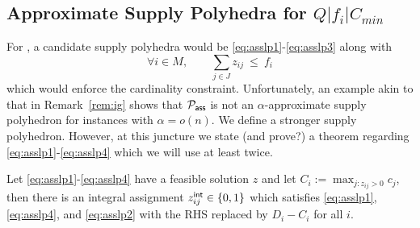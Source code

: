 \subsection{Approximate Supply Polyhedra for $Q|f_i|C_{min}$}
For \cckp, a candidate supply polyhedra would be \eqref{eq:asslp1}-\eqref{eq:asslp3} along with 
\begin{equation}
\textstyle \forall i\in M, \qquad \sum_{j\in J} z_{ij} ~\leq~ f_i \tag{A4} \label{eq:asslp4}
\end{equation}
which would enforce the cardinality constraint. Unfortunately, an example akin to that in Remark~\ref{rem:ig} shows that ${\cal P}_\mathsf{ass}$ is not 
an $\alpha$-approximate supply polyhedron for \cckp instances with $\alpha = o(n)$. We define a stronger supply polyhedron.
However, at this juncture we state (and prove?) a theorem regarding \eqref{eq:asslp1}-\eqref{eq:asslp4} which we will use at least twice.
\begin{theorem}
	\label{thm:shmoystardos}
	Let \eqref{eq:asslp1}-\eqref{eq:asslp4} have a feasible solution $z$ and let $C_i := \max_{j:z_{ij}>0} c_j$, then 
there is an integral assignment $z^{\mathsf{int}}_{ij}\in \{0,1\}$ which satisfies \eqref{eq:asslp1}, \eqref{eq:asslp4}, and \eqref{eq:asslp2} with the RHS replaced by $D_i - C_i$ for all $i$.
\end{theorem}
